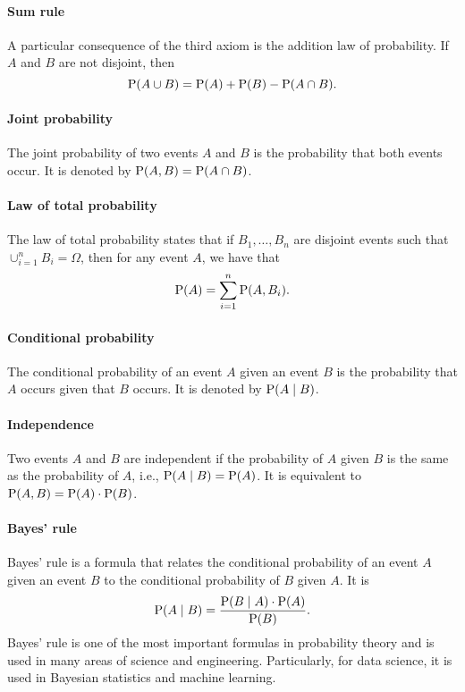 \paragraph{Sum rule}
A particular consequence of the third axiom is the addition law of probability.
If $A$ and $B$ are not disjoint, then
\begin{equation*}
  \operatorname{P}(A \cup B) = \operatorname{P}(A) + \operatorname{P}(B) - \operatorname{P}(A \cap B)\text{.}
\end{equation*}

\paragraph{Joint probability}

The joint probability of two events $A$ and $B$ is the probability that both events
occur.  It is denoted by $\operatorname{P}(A, B) = \operatorname{P}(A \cap B)$.

\paragraph{Law of total probability}

The law of total probability states that if $B_1, \dots, B_n$ are disjoint events
such that $\cup_{i = 1}^n B_i = \Omega$, then for any event $A$, we have that
$$\operatorname{P}(A) = \sum_{i = 1}^n \operatorname{P}(A, B_i)\text{.}$$

\paragraph{Conditional probability}

The conditional probability of an event $A$ given an event $B$ is the probability
that $A$ occurs given that $B$ occurs.  It is denoted by $\operatorname{P}(A \mid B)$.

\paragraph{Independence}

Two events $A$ and $B$ are independent if the probability of $A$ given $B$ is the
same as the probability of $A$, i.e., $\operatorname{P}(A \mid B) = \operatorname{P}(A)$.  It is equivalent to
$\operatorname{P}(A, B) = \operatorname{P}(A) \cdot \operatorname{P}(B)$.

\paragraph{Bayes' rule}

Bayes' rule is a formula that relates the conditional probability of an event $A$
given an event $B$ to the conditional probability of $B$ given $A$.  It is
\begin{equation}
  \label{eq:bayes}
  \operatorname{P}(A \mid B) = \frac{\operatorname{P}(B \mid A) \cdot \operatorname{P}(A)}{\operatorname{P}(B)}\text{.}
\end{equation}
Bayes' rule is one of the most important formulas in probability theory and is used
in many areas of science and engineering.  Particularly, for data science, it is
used in Bayesian statistics and machine learning.

